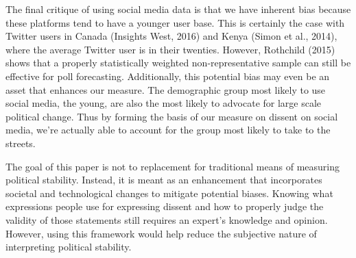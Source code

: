 \documentclass[12pt]{article}
\begin{document}
\begin{spacing}{1.5}
The final critique of using social media data is that we have inherent bias because these platforms tend to have a younger user base. This is certainly the case with Twitter users in Canada (Insights West, 2016) and Kenya (Simon et al., 2014), where the average Twitter user is in their twenties. However, Rothchild (2015) shows that a properly statistically weighted non-representative sample can still be effective for poll forecasting. Additionally, this potential bias may even be an asset that enhances our measure. The demographic group most likely to use social media, the young, are also the most likely to advocate for large scale political change. Thus by forming the basis of our measure on dissent on social media, we're actually able to account for the group most likely to take to the streets.


The goal of this paper is not to replacement for traditional means of measuring political stability. Instead, it is meant as an enhancement that incorporates societal and technological changes to mitigate potential biases. Knowing what expressions people use for expressing dissent and how to properly judge the validity of those statements still requires an expert's knowledge and opinion. However, using this framework would help reduce the subjective nature of interpreting political stability. 


\end{spacing}

\pagebreak




\nocite{*}
\end{document}
